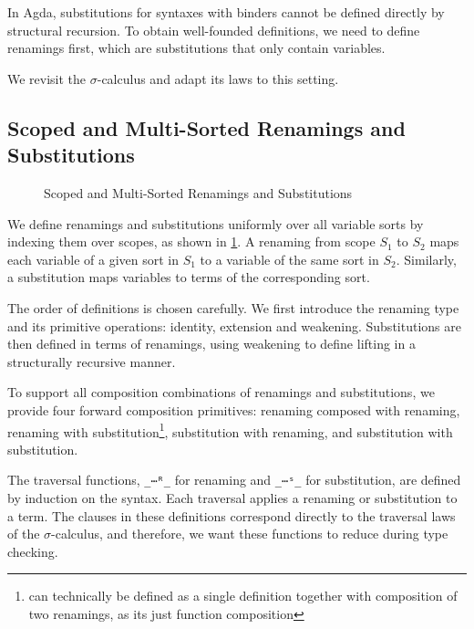 \documentclass[screen,nonacm]{acmart}
\begin{document}
In Agda, substitutions for syntaxes with binders cannot be defined directly by
structural recursion. To obtain well-founded definitions, we need to define
renamings first, which are substitutions that only contain variables.

We revisit the $\sigma$-calculus and adapt its laws to this setting.

\subsection{Scoped and Multi-Sorted Renamings and Substitutions}\label{sec:mis:sub}
\begin{figure}[t]
      \centering
      \begin{minipage}[t]{0.48\linewidth}
            \raggedright{}
            \ERen{}
      \end{minipage}
      \hfill
      \begin{minipage}[t]{0.48\linewidth}
            \raggedright{}
            \ESub{}
      \end{minipage}
      \caption{Scoped and Multi-Sorted Renamings and Substitutions}
      \label{fig:mis:ras}
\end{figure}


We define renamings and substitutions uniformly over all variable sorts by
indexing them over scopes, as shown in \cref{fig:mis:ras}. A renaming from
scope $S_1$ to $S_2$ maps each variable of a given sort in $S_1$ to a variable
of the same sort in $S_2$. Similarly, a substitution maps variables to terms of
the corresponding sort.

The order of definitions is chosen carefully. We first introduce the renaming
type and its primitive operations: identity, extension and weakening.
Substitutions are then defined in terms of renamings, using weakening to define
lifting in a structurally recursive manner.

To support all composition combinations of renamings and substitutions, we
provide four forward composition primitives: renaming composed with renaming,
renaming with substitution\footnote{can technically be defined as a single
      definition together with composition of two renamings, as its just function
      composition}, substitution with renaming, and substitution with substitution.

The traversal functions, \texttt{\_⋯ᴿ\_} for renaming and \texttt{\_⋯ˢ\_} for
substitution, are defined by induction on the syntax. Each traversal applies a
renaming or substitution to a term. The clauses in these definitions correspond
directly to the traversal laws of the $\sigma$-calculus, and therefore, we want
these functions to reduce during type checking.
\end{document}
